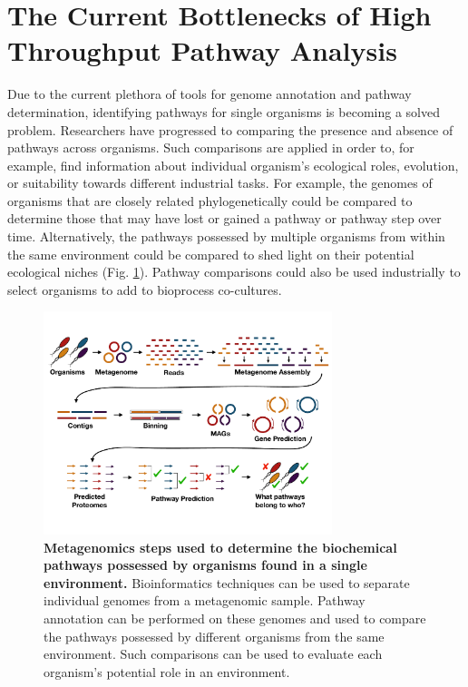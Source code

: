 \section{The Current Bottlenecks of High Throughput Pathway Analysis}

Due to the current plethora of tools for genome annotation and pathway 
determination, identifying pathways for single organisms is becoming a solved 
problem. Researchers have progressed to comparing the presence and absence of 
pathways across organisms. Such comparisons are applied in order to, for 
example, find information about individual organism's ecological roles, 
evolution, or suitability towards different industrial tasks. For example, the 
genomes of organisms that are closely related phylogenetically could be compared 
to determine those that may have lost or gained a pathway or pathway step over 
time. Alternatively, the pathways possessed by multiple organisms from within 
the same environment could be compared to shed light on their potential 
ecological niches (Fig. \ref{fig:metagenomics}). Pathway comparisons could also 
be used industrially to select organisms to add to bioprocess co-cultures.

\begin{figure}[!ht]
  \centering
	\includegraphics[width=0.75\textwidth]{media/metagenomics.pdf}
	\caption[Metagenomics steps used to determine the biochemical pathways 
possessed by organisms found in a single environment.]{\textbf{Metagenomics 
steps used to determine the biochemical pathways possessed by organisms found in 
a single environment.} Bioinformatics techniques can be used to separate 
individual genomes from a metagenomic sample. Pathway annotation can be 
performed on these genomes and used to compare the pathways possessed by 
different organisms from the same environment. Such comparisons can be used to 
evaluate each organism's potential role in an environment.}
	 \label{fig:metagenomics}
\end{figure}

